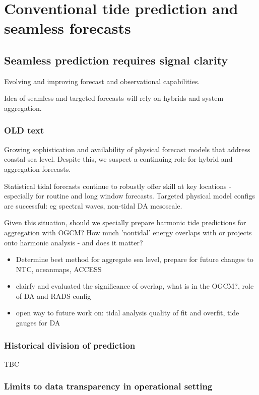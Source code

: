 \chapter{Conventional tide prediction and seamless forecasts}

\section{Seamless prediction requires signal clarity}




Evolving and improving forecast and observational capabilities.

Idea of seamless and targeted forecasts will rely on hybrids and system aggregation. 


\subsection{OLD text}
Growing sophistication and availability of physical forecast models that address coastal sea level. 
Despite this, we suspect a continuing role for hybrid and aggregation forecasts.


Statistical tidal forecasts continue to robustly offer skill at key locations - especially for routine and long window forecasts.
Targeted physical model configs are successful: eg spectral waves, non-tidal DA mesoscale.

Given this situation, should we specially prepare harmonic tide predictions for aggregation with OGCM?
How much 'nontidal' energy overlaps with or projects onto harmonic analysis - and does it matter?

\begin{itemize}
  \item Determine best method for aggregate sea level, prepare for future changes to NTC, oceanmaps, ACCESS
  \item clairfy and evaluated the significance of overlap, what is in the OGCM?, role of DA and RADS config
  \item open way to future work on: tidal analysis quality of fit and overfit, tide gauges for DA
\end{itemize}


\subsection{ Historical division of prediction }
TBC


\subsection{ Limits to data transparency in operational setting }

